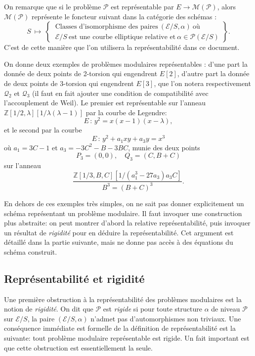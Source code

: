\documentclass[11pt,a4paper]{article}
\newcommand{\Z}{\mathbb{Z}}
\newcommand{\E}{\mathcal{E}}
\renewcommand{\Pr}{\mathcal{P}}
\newcommand{\Qr}{\mathcal{Q}}
\newcommand{\M}{\mathcal{M}}
\newcommand{\vers}{\longrightarrow}
\newcommand{\de}{\,:\,}
\renewcommand{\v}{\vspace{5mm}}
\theoremstyle{definition}
\begin{document}
On remarque que si le problème $\Pr$ est représentable par $E\vers \M(\Pr)$, alors $\M(\Pr)$ représente le foncteur suivant dans la catégorie des schémas :
$$S\ \longmapsto\ \left.
\begin{cases}\ \text{Classes\ d'isomorphisme\ des\ paires}\ (\E/S,\alpha)\ \text{où}\ \\
 \ \E/S\ \text{est\ une\ courbe\ elliptique\ relative\ et}\ \alpha\in \Pr(\E/S)
\end{cases} \right\}.$$
C'est de cette manière que l'on utilisera la représentabilité dans ce document.

\v

On donne deux exemples de problèmes modulaires représentables : d'une part la donnée de deux points de 2-torsion qui engendrent $E[2]$, d'autre part la donnée de deux points de 3-torsion qui engendrent $E[3]$, que l'on notera respectivement $\Qr_2$ et $\Qr_3$ (il faut en fait ajouter une condition de compatibilité avec l'accouplement de Weil). Le premier est représentable sur l'anneau $\Z[1/2,\lambda][1/\lambda(\lambda -1)]$ par la courbe de Legendre:
$$ E\de y^2 = x (x-1) (x-\lambda),$$
et le second par la courbe
$$E\de y^2 + a_1 x y + a_3 y = x^3$$
où $a_1 = 3C - 1$ et $a_3 = -3 C^2 - B - 3 BC$, munie des deux points
$$P_3 = (0,0), \quad Q_3 = (C, B+C)$$
sur l'anneau
$$\frac{\Z[1/3, B, C][1/(a_1^3 - 27 a_3)a_3 C]}{B^3 = (B+C)^3}.$$

En dehors de ces exemples très simples, on ne sait pas donner explicitement un schéma représentant un problème modulaire. Il faut invoquer une construction plus abstraite: on peut montrer d'abord la relative représentabilité, puis invoquer un résultat de \emph{rigidité} pour en déduire la représentabilité. Cet argument est détaillé dans la partie suivante, mais ne donne pas accès à des équations du schéma construit.


\subsection{Représentabilité et rigidité}


Une première obstruction à la représentabilité des problèmes modulaires est la notion de \emph{rigidité}. On dit que $\Pr$ est \emph{rigide} si pour toute structure $\alpha$ de niveau $\Pr$ sur $\E/S$, la paire $(\E/S, \alpha)$ n'admet pas d'automorphismes non triviaux. Une conséquence immédiate est formelle de la définition de représentabilité est la suivante: tout problème modulaire représentable est rigide. Un fait important est que cette obstruction est essentiellement la seule.
\end{document}
